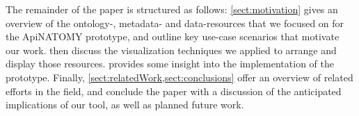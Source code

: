 The remainder of the paper is structured as follows: \cref{sect:motivation} gives an overview of the
\mbox{ontology-,} metadata- and data-resources that we focused on for the ApiNATOMY prototype, and
outline key use-case scenarios that motivate our work. 
then discuss the visualization techniques we applied to arrange and display those resources.
 provides some insight into the implementation of the prototype. Finally,
\cref{sect:relatedWork,sect:conclusions} offer an overview of related efforts in the field, and
conclude the paper with a discussion of the anticipated implications of our tool, as well as planned
future work.















